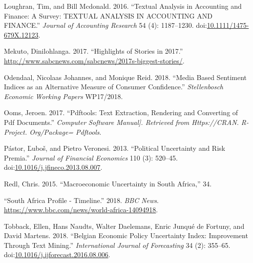 \documentclass[11pt,preprint, authoryear]{elsarticle}
\numberwithin{equation}{section}
\numberwithin{figure}{section}
\numberwithin{table}{section}
\begin{document}
\hypertarget{ref-Loughran2016}{}
Loughran, Tim, and Bill Mcdonald. 2016. ``Textual Analysis in Accounting
and Finance: A Survey: TEXTUAL ANALYSIS IN ACCOUNTING AND FINANCE.''
\emph{Journal of Accounting Research} 54 (4): 1187--1230.
doi:\href{https://doi.org/10.1111/1475-679X.12123}{10.1111/1475-679X.12123}.

\hypertarget{ref-Mekuto2017}{}
Mekuto, Dinilohlanga. 2017. ``Highlights of Stories in 2017.''
\url{http://www.sabcnews.com/sabcnews/2017s-biggest-stories/}.

\hypertarget{ref-Odendaal2018}{}
Odendaal, Nicolaas Johannes, and Monique Reid. 2018. ``Media Based
Sentiment Indices as an Alternative Measure of Consumer Confidence.''
\emph{Stellenbosch Economic Working Papers} WP17/2018.

\hypertarget{ref-Ooms2017}{}
Ooms, Jeroen. 2017. ``Pdftools: Text Extraction, Rendering and
Converting of Pdf Documents.'' \emph{Computer Software Manual{]}.
Retrieved from Https://CRAN. R-Project. Org/Package= Pdftools}.

\hypertarget{ref-Pastor2013}{}
Pástor, Ľuboš, and Pietro Veronesi. 2013. ``Political Uncertainty and
Risk Premia.'' \emph{Journal of Financial Economics} 110 (3): 520--45.
doi:\href{https://doi.org/10.1016/j.jfineco.2013.08.007}{10.1016/j.jfineco.2013.08.007}.

\hypertarget{ref-Redl2015}{}
Redl, Chris. 2015. ``Macroeconomic Uncertainty in South Africa,'' 34.

\hypertarget{ref-2018}{}
``South Africa Profile - Timeline.'' 2018. \emph{BBC News}.
\url{https://www.bbc.com/news/world-africa-14094918}.

\hypertarget{ref-Tobback2018}{}
Tobback, Ellen, Hans Naudts, Walter Daelemans, Enric Junqué de Fortuny,
and David Martens. 2018. ``Belgian Economic Policy Uncertainty Index:
Improvement Through Text Mining.'' \emph{International Journal of
Forecasting} 34 (2): 355--65.
doi:\href{https://doi.org/10.1016/j.ijforecast.2016.08.006}{10.1016/j.ijforecast.2016.08.006}.




\end{document}
